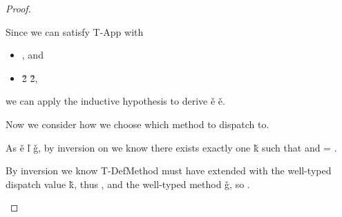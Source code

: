 \begin{lemma}
\begin{proof}
\begin{case}[B-BetaMulti]
\begin{itemize}
\begin{subcase}[T-App]
         Since we can satisfy T-App with
       \begin{itemize}
         \item
         , and
         \item
  \judgementrewrite {\propenv{}} {\v{2}} {\s{}}
             {
                         {}}
                       {}
                       {\v{2}},
       \end{itemize}
       we can apply the inductive hypothesis
       to derive
  \judgementrewrite {\propenv{}} {\v{e}} 
  {
              {}
              {\x{}}}
             {
                         {}
                         {\x{}}}
                       {\replacefor
                         {}
                         {}
                         {\x{}}}
                       {\v{e}}.

 Now we consider how we choose which method to dispatch to.

 As 
  \getmethod {\disptable{}}
             {\v{e}}
             {\v{l}}
             {\v{g}}, by inversion on \getmethodliteral
             we know
   there exists exactly one \v{k} such that 
    and  = {\true{}}.

   By inversion we know T-DefMethod must have extended \disptable{} 
   with the well-typed dispatch value \v{k},
   thus {}, and
   the well-typed method \v{g},
   so {}.


\end{subcase}
\end{itemize}
\end{case}
\end{proof}
\end{lemma}

